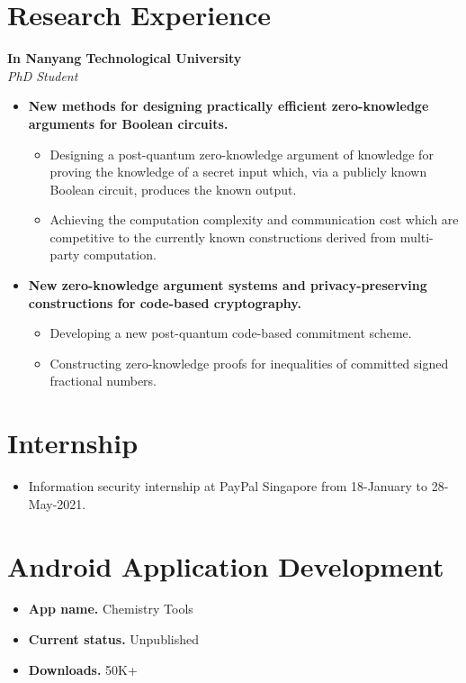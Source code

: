 \documentclass[a4paper, 11pt]{article}
\begin{document}
	\section{Research Experience}
	\textbf{In Nanyang Technological University}\\
	\textit{PhD Student}
	\begin{itemize}
		\item \textbf{New methods for designing practically efficient zero-knowledge arguments for Boolean circuits.} \begin{itemize}
			\item Designing a post-quantum zero-knowledge argument of knowledge for proving the knowledge of a secret input which, via a publicly known Boolean circuit, produces the known output.
			\item Achieving the computation complexity and communication cost which are competitive to the currently known constructions derived from multi-party computation.
		\end{itemize}
		\item \textbf{New zero-knowledge argument systems and privacy-preserving constructions for code-based cryptography.}
		\begin{itemize}
			\item Developing a new post-quantum code-based commitment scheme.
			\item Constructing zero-knowledge proofs for inequalities of committed signed fractional numbers.
		\end{itemize}
	\end{itemize}
	
	\section{Internship}
	\begin{itemize}
		\item Information security internship at PayPal Singapore from 18-January to 28-May-2021.
	\end{itemize}
	
	\section{Android Application Development}
	\begin{itemize}
		\item \textbf{App name.} Chemistry Tools 
		
		\item \textbf{Current status.} Unpublished
		
		\item \textbf{Downloads.} 50K+
	\end{itemize}
	
\end{document}
